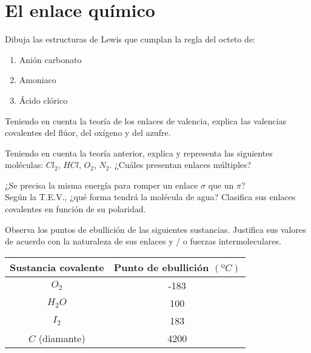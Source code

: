 \section{El enlace químico}

\begin{prob}
Dibuja las estructuras de Lewis que cumplan la regla del octeto de:
\begin{enumerate}
	\item Anión carbonato
	\item Amoniaco
	\item Ácido clórico
\end{enumerate}
\end{prob}


\begin{prob}
Teniendo en cuenta la teoría de los enlaces de valencia, explica las valencias
covalentes del flúor, del oxígeno y del azufre. 
\end{prob}


\begin{prob}
Teniendo en cuenta la teoría anterior, explica y representa las siguientes moléculas:
$Cl_2$, $HCl$, $O_2$, $N_2$. ¿Cuáles presentan enlaces múltiples?
\end{prob}


\begin{prob}
¿Se precisa la misma energía para romper un enlace $\sigma$ que un $\pi$?\\
Según la T.E.V., ¿qué forma tendrá la molécula de agua? Clasifica sus enlaces covalentes
en función de su polaridad.
\end{prob}


\begin{prob}
Observa los puntos de ebullición de las siguientes sustancias. Justifica sus valores de acuerdo con
la naturaleza de sus enlaces y / o fuerzas intermoleculares.
\vspace{8pt}

\begin{tabular}{|c|c|}
\hline
Sustancia covalente& Punto de ebullición $(ºC)$\\
\hline
$O_2$&-183\\
$H_2O$&100\\
$I_2$&183\\
$C$ (diamante)&4200\\
\hline
\end{tabular}
\end{prob}


